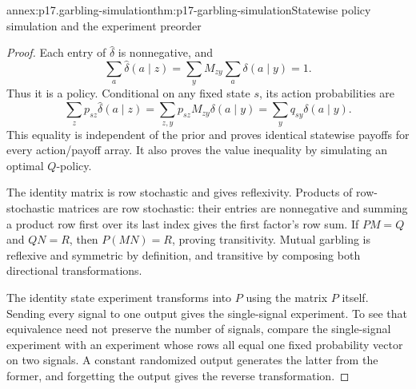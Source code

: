 \begin{annexitem}{annex:p17.garbling-simulation}{thm:p17-garbling-simulation}{Statewise policy simulation and the experiment preorder}
\begin{proof}
Each entry of \(\widehat\delta\) is nonnegative, and
\[
 \sum_a\widehat\delta(a\mid z)
   =\sum_y M_{zy}\sum_a\delta(a\mid y)=1.
\]
Thus it is a policy. Conditional on any fixed state \(s\), its action
probabilities are
\[
 \sum_z p_{sz}\widehat\delta(a\mid z)
   =\sum_{z,y}p_{sz}M_{zy}\delta(a\mid y)
   =\sum_y q_{sy}\delta(a\mid y).
\]
This equality is independent of the prior and proves identical statewise
payoffs for every action/payoff array. It also proves the value inequality
by simulating an optimal \(Q\)-policy.

The identity matrix is row stochastic and gives reflexivity. Products
of row-stochastic matrices are row stochastic: their entries are
nonnegative and summing a product row first over its last index gives
the first factor's row sum. If \(PM=Q\) and \(QN=R\), then
\(P(MN)=R\), proving transitivity.
Mutual garbling is reflexive and symmetric by definition, and transitive
by composing both directional transformations.

The identity state experiment transforms into \(P\) using the matrix
\(P\) itself. Sending every signal to one output gives the single-signal
experiment. To see that equivalence need not preserve the number of
signals, compare the single-signal experiment with an experiment whose
rows all equal one fixed probability vector on two signals. A constant
randomized output generates the latter from the former, and forgetting
the output gives the reverse transformation.
\end{proof}
\end{annexitem}

